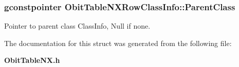 \subsubsection{\setlength{\rightskip}{0pt plus 5cm}gconstpointer {\bf Obit\-Table\-NXRow\-Class\-Info::Parent\-Class}}\label{structObitTableNXRowClassInfo_o3}


Pointer to parent class Class\-Info, Null if none. 



The documentation for this struct was generated from the following file:\begin{CompactItemize}
\item 
{\bf Obit\-Table\-NX.h}\end{CompactItemize}
